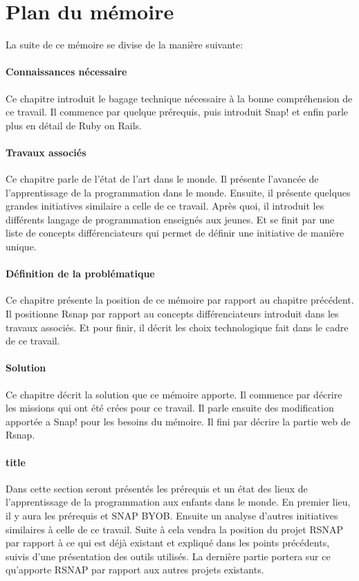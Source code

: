 \section{Plan du mémoire}
La suite de ce mémoire se divise de la manière suivante:

\paragraph{Connaissances nécessaire}
Ce chapitre introduit le bagage technique nécessaire à la bonne compréhension de ce travail. Il commence par quelque prérequis, puis introduit Snap! et enfin parle plus en détail de Ruby on Rails.

\paragraph{Travaux associés}
Ce chapitre parle de l'état de l'art dans le monde. Il présente l'avancée de l'apprentissage de la programmation dans le monde. Ensuite, il présente quelques grandes initiatives similaire a celle de ce travail. Après quoi, il introduit les différents langage de programmation enseignés aux jeunes. Et se finit par une liste de concepts différenciateurs qui permet de définir une initiative de manière unique.

\paragraph{Définition de la problématique}
Ce chapitre présente la position de ce mémoire par rapport au chapitre précédent. Il positionne Rsnap par rapport au concepts différenciateurs introduit dans les travaux associés. Et pour finir, il décrit les choix technologique fait dans le cadre de ce travail.

\paragraph{Solution}
Ce chapitre décrit la solution que ce mémoire apporte. Il commence par décrire les missions qui ont été crées pour ce travail. Il parle ensuite des modification apportée a Snap! pour les besoins du mémoire. Il fini par décrire la partie web de Rsnap.

\paragraph{title}


Dans cette section seront présentés les prérequis et un état des lieux de l'apprentissage de la programmation aux enfants dans le monde. En premier lieu, il y aura les prérequis et SNAP BYOB. Ensuite un analyse d'autres initiatives similaires à celle de ce travail. Suite à cela vendra la position du projet RSNAP par rapport à ce qui est déjà existant et expliqué dans les points précédents, suivis d'une présentation des outils utilisés. La dernière partie portera sur ce qu'apporte RSNAP par rapport aux autres projets existants. 
